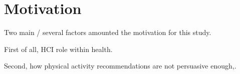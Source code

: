 \chapter*{Motivation} 

Two main / several factors amounted the motivation for this study. 

First of all, HCI role within health. 

Second, how physical activity recommendations are not persuasive enough,. 

